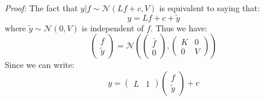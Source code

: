 \documentclass{article}
\theoremstyle{definition}
\theoremstyle{remark}
\theoremstyle{remark}
\begin{document}
\noindent\textit{Proof:} The fact that $y|f\sim\mathcal{N}(Lf+c,V)$ is equivalent to saying that:
\begin{equation*}
    y=Lf+c+\tilde{y}
\end{equation*}
where $\tilde{y}\sim\mathcal{N}(0,V)$ is independent of $f$. Thus we have:
\begin{equation*}
    \begin{pmatrix}
        f \\
        \tilde{y}
    \end{pmatrix}=\mathcal{N}\left(\begin{pmatrix}
                                \bar{f} \\
                                0
                            \end{pmatrix},\begin{pmatrix}
                                            K & 0 \\
                                            0 & V
                                          \end{pmatrix}\right)
\end{equation*}
Since we can write:
\begin{equation*}
    y=\begin{pmatrix}
        L & 1
    \end{pmatrix}\begin{pmatrix}
                    f \\
                    \tilde{y}
                 \end{pmatrix}+c
\end{equation*}
\end{document}
